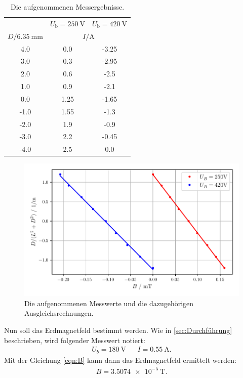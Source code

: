 \begin{table} 
    \centering
    \caption{Die aufgenommenen Messergebnisse. } 
    \label{tab:bFeldTeil1}
    \begin{tabular}{c c c }%
    \toprule
        & $U_\text{b} = \SI{250}{\volt}$ & $U_\text{b} = \SI{420}{\volt}$\\
    \cmidrule(lr){2-3}
    $ D / \SI{6.35}{\milli\metre}$ & \multicolumn{2}{c}{$I /\si{\ampere} $ }\\
      \midrule
      4.0 & 0.0 & -3.25 \\
      3.0 & 0.3 & -2.95 \\
      2.0 & 0.6 & -2.5 \\
      1.0 & 0.9 & -2.1 \\
      0.0 & 1.25 & -1.65 \\
      -1.0 & 1.55 & -1.3 \\
      -2.0 & 1.9 & -0.9 \\
      -3.0 & 2.2 & -0.45 \\
      -4.0 & 2.5 & 0.0 \\
      \bottomrule
    \end{tabular}
  \end{table}

  \begin{figure} 
    \centering
    \includegraphics[width=\textwidth]{bilder/B_Feld_Teil_1_beide.pdf}
    \caption{Die aufgenommenen Messwerte und die dazugehörigen Ausgleichsrechnungen.}
    \label{fig:bFeldTeil1}
\end{figure}

Nun soll das Erdmagnetfeld bestimmt werden. Wie in \autoref{sec:Durchführung} beschrieben, wird folgender Messwert notiert:
\begin{align*}
    U_b = \SI{180}{\volt}& &I= \SI{0.55}{\ampere}.
\end{align*}
Mit der Gleichung \eqref{eqn:B} kann dann das Erdmagnetfeld ermittelt werden:
\begin{align*}
    B = \SI{3.5074 e-5}{\tesla}.
\end{align*}
